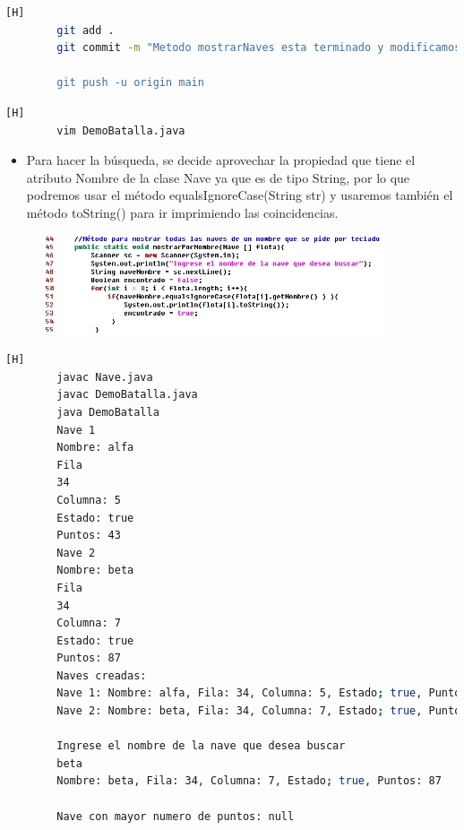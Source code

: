 \documentclass{article}
\begin{document}
	\begin{lstlisting}[language=bash,caption={Commit:  "Metodo mostrarNaves esta terminado y modificamos el tamaño del arreglo para compilar mas rapido"}][H]
		git add .
		git commit -m "Metodo mostrarNaves esta terminado y modificamos el tamano del arreglo para compilar mas rapido""
					
		git push -u origin main
	\end{lstlisting}	
	
	\begin{lstlisting}[language=bash,caption={Completando método mostrarPorNombre }][H]
		vim DemoBatalla.java
	\end{lstlisting}

	\begin{itemize}	
		\item Para hacer la búsqueda, se decide aprovechar la propiedad que tiene el atributo Nombre de la clase Nave ya que es de tipo String, por lo que podremos usar el método equalsIgnoreCase(String str) y usaremos también el método toString() para ir imprimiendo las coincidencias. 
	\end{itemize}
	
	\begin{figure}[H]
		\centering
		\includegraphics[width=0.9\textwidth,keepaspectratio]{img/5.jpg}
	\end{figure}




	\begin{lstlisting}[language=bash,caption={Procedemos a compilar y ejecutar el programa para probar este método con una modificación en el tamaño del arreglo el cual se pondrá en 2.}][H]
		javac Nave.java
		javac DemoBatalla.java
		java DemoBatalla
		Nave 1
		Nombre: alfa
		Fila
		34
		Columna: 5
		Estado: true
		Puntos: 43
		Nave 2
		Nombre: beta
		Fila
		34
		Columna: 7
		Estado: true
		Puntos: 87
		Naves creadas:
		Nave 1: Nombre: alfa, Fila: 34, Columna: 5, Estado; true, Puntos: 43
		Nave 2: Nombre: beta, Fila: 34, Columna: 7, Estado; true, Puntos: 87
		
		Ingrese el nombre de la nave que desea buscar
		beta
		Nombre: beta, Fila: 34, Columna: 7, Estado; true, Puntos: 87
		
		Nave con mayor numero de puntos: null
	\end{lstlisting}
	
\end{document}
